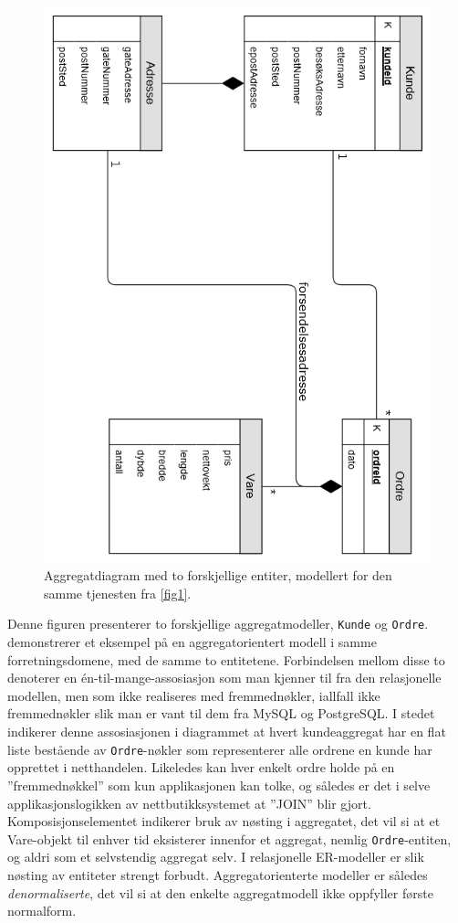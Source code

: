 \begin{figure}[ht]
    \centering
    \includegraphics[scale=0.7]{fig/NettbutikkAggregatModell.png}
    \caption{Aggregatdiagram med to forskjellige entiter, modellert for den samme tjenesten fra \ref{fig1}.}
    \label{fig2}
\end{figure}

Denne figuren presenterer to forskjellige aggregatmodeller, \texttt{Kunde} og \texttt{Ordre}. \cite{sadalage2013} demonstrerer et eksempel på en aggregatorientert modell i samme forretningsdomene, med de samme to entitetene. Forbindelsen mellom disse to denoterer en én-til-mange-assosiasjon som man kjenner til fra den relasjonelle modellen, men som ikke realiseres med fremmednøkler, iallfall ikke fremmednøkler slik man er vant til dem fra MySQL og PostgreSQL. I stedet indikerer denne assosiasjonen i diagrammet at hvert kundeaggregat har en flat liste bestående av \texttt{Ordre}-nøkler som representerer alle ordrene en kunde har opprettet i netthandelen. Likeledes kan hver enkelt ordre holde på en ''fremmednøkkel'' som kun applikasjonen kan tolke, og således er det i selve applikasjonslogikken av nettbutikksystemet at ''JOIN'' blir gjort. Komposisjonselementet indikerer bruk av nøsting i aggregatet, det vil si at et Vare-objekt til enhver tid eksisterer innenfor et aggregat, nemlig \texttt{Ordre}-entiten, og aldri som et selvstendig aggregat selv. I relasjonelle ER-modeller er slik nøsting av entiteter strengt forbudt. Aggregatorienterte modeller er således \emph{denormaliserte}, det vil si at den enkelte aggregatmodell ikke oppfyller første normalform.


